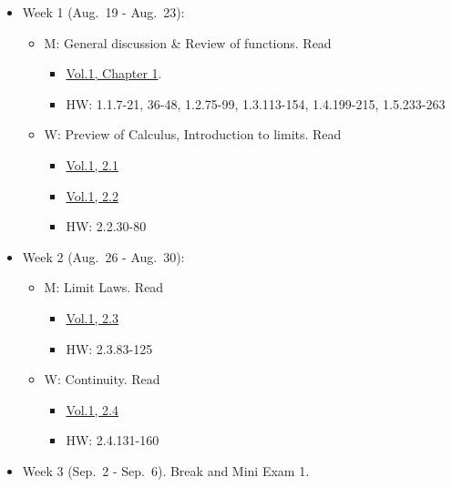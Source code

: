 \documentclass[
]{article}
\providecommand{\tightlist}{%
  \setlength{\itemsep}{0pt}\setlength{\parskip}{0pt}}
\begin{document}
\begin{itemize}
\tightlist
\item
  Week 1 (Aug.~19 - Aug.~23):

  \begin{itemize}
  \tightlist
  \item
    M: General discussion \& Review of functions. Read

    \begin{itemize}
    \tightlist
    \item
      \href{https://openstax.org/books/calculus-volume-1/pages/1-introduction}{Vol.1, Chapter 1}.
    \item
      HW: 1.1.7-21, 36-48, 1.2.75-99, 1.3.113-154, 1.4.199-215, 1.5.233-263
    \end{itemize}
  \item
    W: Preview of Calculus, Introduction to limits. Read

    \begin{itemize}
    \tightlist
    \item
      \href{https://openstax.org/books/calculus-volume-1/pages/2-1-a-preview-of-calculus}{Vol.1, 2.1}
    \item
      \href{https://openstax.org/books/calculus-volume-1/pages/2-2-the-limit-of-a-function}{Vol.1, 2.2}
    \item
      HW: 2.2.30-80
    \end{itemize}
  \end{itemize}
\item
  Week 2 (Aug.~26 - Aug.~30):

  \begin{itemize}
  \tightlist
  \item
    M: Limit Laws. Read

    \begin{itemize}
    \tightlist
    \item
      \href{https://openstax.org/books/calculus-volume-1/pages/2-3-the-limit-laws}{Vol.1, 2.3}
    \item
      HW: 2.3.83-125
    \end{itemize}
  \item
    W: Continuity. Read

    \begin{itemize}
    \tightlist
    \item
      \href{https://openstax.org/books/calculus-volume-1/pages/2-4-continuity}{Vol.1, 2.4}
    \item
      HW: 2.4.131-160
    \end{itemize}
  \end{itemize}
\item
  Week 3 (Sep.~2 - Sep.~6). Break and Mini Exam 1.


\end{itemize}
\end{document}
